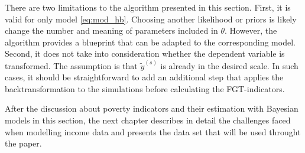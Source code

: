 There are two limitations to the algorithm presented in this section.
First, it is valid for only model \ref{eq:mod_hb}.
Choosing another likelihood or priors is likely change the number and meaning of parameters included in $\theta$.
However, the algorithm provides a blueprint that can be adapted to the corresponding model.
Second, it does not take into consideration whether the dependent variable is transformed.
The assumption is that $\tilde y^{(s)}$ is already in the desired scale.
In such cases, it should be straightforward to add an additional step that applies the backtransformation to the simulations before calculating the FGT-indicators.

After the discussion about poverty indicators and their estimation with Bayesian models in this section, the next chapter describes in detail the challenges faced when modelling income data and presents the data set that will be used throught the paper.